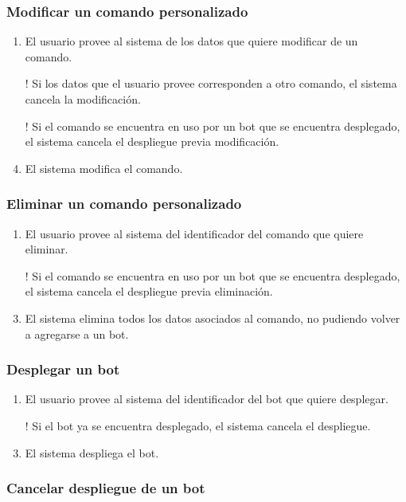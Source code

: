 \subsubsection{Modificar un comando personalizado}

\begin{enumerate}
	\item El usuario provee al sistema de los datos que quiere modificar de un comando.
	\item[!] Si los datos que el usuario provee corresponden a otro comando, el sistema cancela la modificación.
	\item[!] Si el comando se encuentra en uso por un bot que se encuentra desplegado, el sistema cancela el despliegue previa modificación.
	\item El sistema modifica el comando.
\end{enumerate}

\subsubsection{Eliminar un comando personalizado}

\begin{enumerate}
	\item El usuario provee al sistema del identificador del comando que quiere eliminar.
	\item[!] Si el comando se encuentra en uso por un bot que se encuentra desplegado, el sistema cancela el despliegue previa eliminación.
	\item El sistema elimina todos los datos asociados al comando, no pudiendo volver a agregarse a un bot.
\end{enumerate}

\subsubsection{Desplegar un bot}

\begin{enumerate}
	\item El usuario provee al sistema del identificador del bot que quiere desplegar.
	\item[!] Si el bot ya se encuentra desplegado, el sistema cancela el despliegue.
	\item El sistema despliega el bot.
\end{enumerate}

\subsubsection{Cancelar despliegue de un bot}

